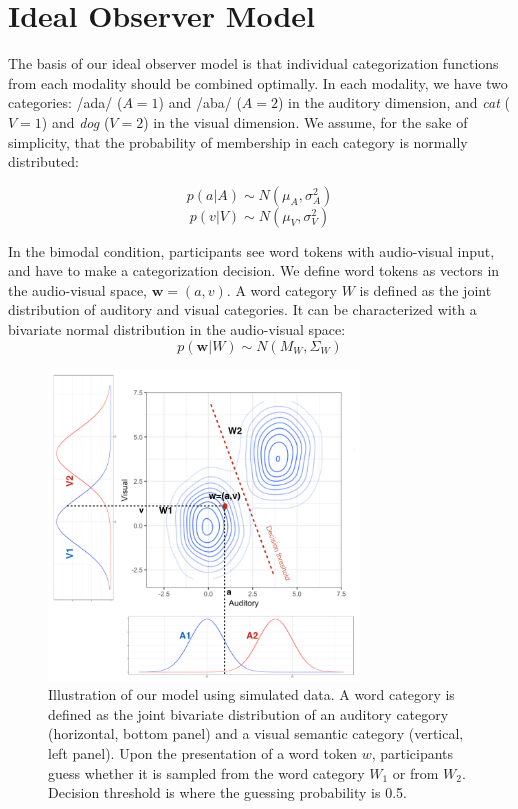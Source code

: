 \documentclass[10pt,letterpaper]{article}
\begin{document}
\section{Ideal Observer Model}

The basis of our ideal observer model is that individual categorization functions from each modality should be combined optimally.
In each modality, we have two categories: /ada/ ($A=1$) and /aba/ ($A=2$) in the auditory dimension, and \textit{cat} ($V=1$) and \textit{dog} ($V=2$) in the visual dimension.
We assume, for the sake of simplicity, that the probability of membership in each category is normally distributed:

$$ p(a | A) \sim  N(\mu_A, \sigma^2_A) $$
$$ p(v | V) \sim  N(\mu_V, \sigma^2_V) $$

In the bimodal condition, participants see word tokens with audio-visual input, and have to make a categorization decision. We define word tokens as vectors in the audio-visual space, $\mathbf{w}=(a,v)$.
A word category $W$ is defined as the joint distribution of auditory and visual categories. It can be characterized with a bivariate normal distribution in the audio-visual space:
$$ p(\mathbf{w} | W) \sim  N(M_W, \Sigma_W) $$

\begin{figure}[tp]
  \centering
  \includegraphics[width=3.25in]{MyTask.png}
  \caption{Illustration of our model using simulated data. A word category is defined as the joint bivariate distribution of an auditory category (horizontal, bottom panel) and a visual semantic category (vertical, left panel). Upon the presentation of a word token $w$, participants guess whether it is sampled from the word category $W_1$ or from $W_2$. Decision threshold is where the guessing probability is 0.5.}
  \label{fig:space}
\end{figure}
\end{document}
